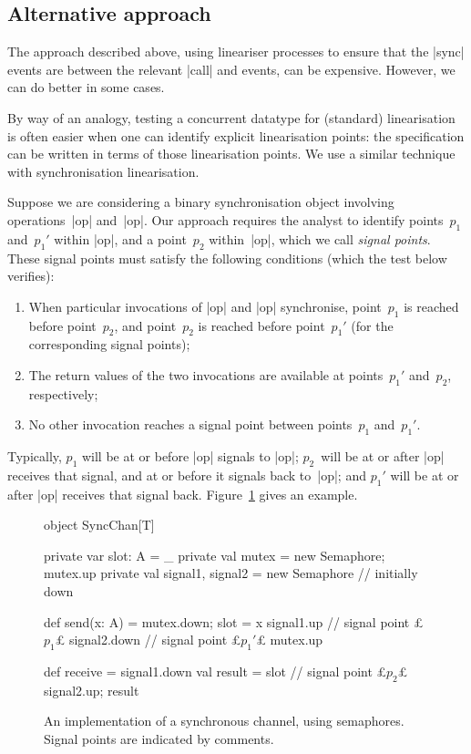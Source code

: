 \subsection{Alternative approach}

The approach described above, using lineariser processes to ensure that the
|sync| events are between the relevant |call| and  events, can be
expensive.  However, we can do better in some cases.

By way of an analogy, testing a concurrent datatype for (standard)
linearisation is often easier when one can identify explicit linearisation
points: the specification can be written in terms of those linearisation
points.  We use a similar technique with synchronisation linearisation. 

Suppose we are considering a binary synchronisation object involving
operations~|op| and~|op|.  Our approach requires the analyst to identify
points~$p_1$ and~$p_1'$ within |op|, and a point~$p_2$ within~|op|,
which we call \emph{signal points}.  These signal points must satisfy the
following conditions (which the test below verifies):
%
\begin{enumerate}
\item\label{mc:condition1} When particular invocations of |op| and |op|
  synchronise, point~$p_1$ is reached before point~$p_2$, and point~$p_2$ is
  reached before point~$p_1'$ (for the corresponding signal points);

\item\label{mc:condition2} The return values of the two invocations are
  available at points~$p_1'$ and~$p_2$, respectively;

\item\label{mc:condition3} No other invocation reaches a signal point between
  points~$p_1$ and~$p_1'$.
\end{enumerate}

Typically, $p_1$ will be at or before |op| signals to |op|; $p_2$~will
be at or after |op| receives that signal, and at or before it signals back
to~|op|; and $p_1'$ will be at or after |op| receives that signal back.
Figure~\ref{fig:signal-points} gives an example.


\begin{figure}[thp]
\begin{scala}
object SyncChan[T]{
  private var slot: A = _
  private val mutex = new Semaphore; mutex.up
  private val signal1, signal2 = new Semaphore // initially down

  def send(x: A) = {
    mutex.down; slot = x
    signal1.up        // signal point £$p_1$£
    signal2.down      // signal point £$p_1'$£
    mutex.up
  }

  def receive = {
    signal1.down
    val result = slot // signal point £$p_2$£
    signal2.up; result
  }
}
\end{scala}
\caption{An implementation of a synchronous channel, using semaphores.  Signal
  points are indicated by comments.  }
\label{fig:signal-points}
\end{figure}

